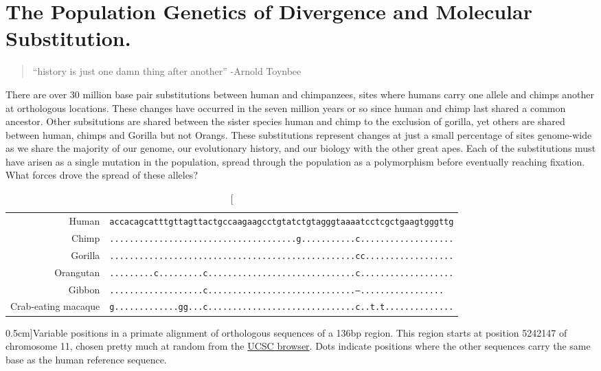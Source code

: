 
\chapter{The Population Genetics of Divergence and Molecular Substitution.}
\begin{quote}
``history is just one damn thing after another'' -Arnold Toynbee
\end{quote} %


There are over $30$ million base pair substitutions between human and chimpanzees,
sites where humans carry one allele and chimps another at orthologous locations. These changes
have occurred in the seven million years or so since human and chimp
last shared a common ancestor. Other subsitutions are shared between
the sister species human and chimp to the exclusion of gorilla, yet
others are shared between human, chimps and Gorilla but not Orangs. These substitutions represent changes
at just a small percentage of sites genome-wide as we share the majority of our
genome, our evolutionary history, and our biology with the
other great apes. Each of the substitutions must have arisen as a single mutation in the
population, spread through the population as a polymorphism before
eventually reaching fixation. What forces drove the spread of these
alleles?
\begin{table}
\small{
  \begin{tabular}{rl}
Human & \texttt{accacagcatttgttagttactgccaagaagcctgtatctgtagggtaaaatcctcgctgaagtgggttg}\\
Chimp & \texttt{......................................g...........c...................}\\
Gorilla & \texttt{..................................................cc..................}\\
Orangutan & \texttt{.........c.........c..............................c...................}\\
Gibbon & \texttt{...................c..............................---.................}\\
Crab-eating macaque & \texttt{g.............gg...c..............................c..t.t..............}\\
  \end{tabular}
  }
\caption[][0.5cm]{Variable positions in a primate alignment of orthologous sequences
  of a 136bp region. This region starts at position 5242147 of
  chromosome 11, chosen pretty much at random from the \href{https://genome.ucsc.edu/cgi-bin/hgc?hgsid=751620175_qgtFpsA9hP8yVBVZ1ezZl3Iy3N1L\&c=chr17\&l=43084819\&r=43084957\&o=43084819\&t=43084957\&g=multiz30way\&i=multiz30way}{UCSC browser}. Dots indicate
  positions where the other sequences carry the same base as the human
reference sequence. } 
\end{table}

